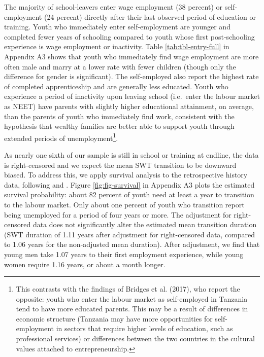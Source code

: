 \documentclass[
  a4paper, twoside, 12pt]{book}
\begin{document}
The majority of school-leavers enter wage employment (38 percent) or self-employment (24 percent) directly after their last observed period of education or training. Youth who immediately enter self-employment are younger and completed fewer years of schooling compared to youth whose first post-schooling experience is wage employment or inactivity. Table \ref{tab:tbl-entry-full} in Appendix A3 shows that youth who immediately find wage employment are more often male and marry at a lower rate with fewer children (though only the difference for gender is significant). The self-employed also report the highest rate of completed apprenticeship and are generally less educated. Youth who experience a period of inactivity upon leaving school (i.e.~enter the labour market as NEET) have parents with slightly higher educational attainment, on average, than the parents of youth who immediately find work, consistent with the hypothesis that wealthy families are better able to support youth through extended periods of unemployment\footnote{This contrasts with the findings of Bridges et al. (2017), who report the opposite: youth who enter the labour market as self-employed in Tanzania tend to have more educated parents.  This may be a result of differences in economic structure (Tanzania may have more opportunities for self-employment in sectors that require higher levels of education, such as professional services) or differences between the two countries in the cultural values attached to entrepreneurship.}.

As nearly one sixth of our sample is still in school or training at endline, the data is right-censored and we expect the mean SWT transition to be downward biased. To address this, we apply survival analysis to the retrospective history data, following \textcite{nordman2015} and \textcite{manacorda2017}. Figure \ref{fig:fig-survival} in Appendix A3 plots the estimated survival probability: about 82 percent of youth need at least a year to transition to the labour market. Only about one percent of youth who transition report being unemployed for a period of four years or more. The adjustment for right-censored data does not significantly alter the estimated mean transition duration (SWT duration of 1.11 years after adjustment for right-censored data, compared to 1.06 years for the non-adjusted mean duration). After adjustment, we find that young men take 1.07 years to their first employment experience, while young women require 1.16 years, or about a month longer.
\end{document}
